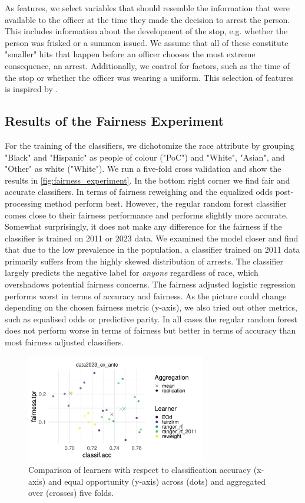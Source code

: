 As features, we select variables that should resemble the information that were available to the officer at the time they made the decision to arrest the person. This includes information about the development of the stop, e.g. whether the person was frisked or a summon issued. We assume that all of these constitute "smaller" hits that happen before an officer chooses the most extreme consequence, an arrest. Additionally, we control for factors, such as the time of the stop or whether the officer was wearing a uniform. This selection of features is inspired by \cite{Badr2022DTFANSP}.

\subsection{Results of the Fairness Experiment}
For the training of the classifiers, we dichotomize the race attribute by grouping "Black" and "Hispanic" as people of colour ("PoC") and "White", "Asian", and "Other" as white ("White"). We run a five-fold cross validation and show the results in \autoref{fig:fairness_experiment}. In the bottom right corner we find fair and accurate classifiers. In terms of fairness reweighing and the equalized odds post-processing method perform best. However, the regular random forest classifier comes close to their fairness performance and performs slightly more accurate. Somewhat surprisingly, it does not make any difference for the fairness if the classifier is trained on 2011 or 2023 data.
We examined the model closer and find that due to the low prevalence in the population, a classifier trained on 2011 data primarily suffers from the highly skewed distribution of arrests. The classifier largely predicts the negative label for \textit{anyone} regardless of race, which overshadows potential fairness concerns. The fairness adjusted logistic regression performs worst in terms of accuracy and fairness.
As the picture could change depending on the chosen fairness metric (y-axis), we also tried out other metrics, such as equalised odds or predictive parity. In all cases the regular random forest does not perform worse in terms of fairness but better in terms of accuracy than most fairness adjusted classifiers.
\begin{figure}
    \centering
    \includegraphics[width=0.7\textwidth]{../figures/sqf_case_study_plot3.pdf}
    \caption{Comparison of learners with respect to classification accuracy (x-axis) and equal opportunity (y-axis) across (dots) and aggregated over (crosses) five folds.}
    \label{fig:fairness_experiment}
\end{figure}

